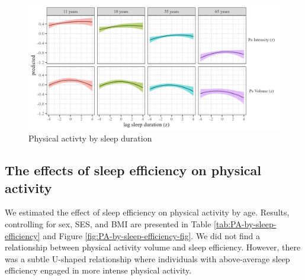 \documentclass[
  man]{apa6}
\begin{document}
\begin{figure}
\includegraphics[width=1.1\linewidth]{../Figures/Pa on sleep_duration_lag} \caption{Physical activty by sleep duration}\label{fig:PA-by-sleep-duration-fig}
\end{figure}

\hypertarget{the-effects-of-sleep-efficiency-on-physical-activity}{%
\subsection{The effects of sleep efficiency on physical activity}\label{the-effects-of-sleep-efficiency-on-physical-activity}}

We estimated the effect of sleep efficiency on physical activity by age. Results, controlling for sex, SES, and BMI are presented in Table \ref{tab:PA-by-sleep-efficiency} and Figure \ref{fig:PA-by-sleep-efficiency-fig}. We did not find a relationship between physical activity volume and sleep efficiency. However, there was a subtle U-shaped relationship where individuals with above-average sleep efficiency engaged in more intense physical activity.
\end{document}
